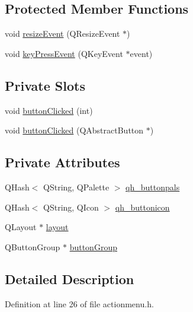 \subsection*{Protected Member Functions}
\begin{DoxyCompactItemize}
\item 
void \hyperlink{classActionMenu_a437f074013c2ac56b42050e67e6e0793}{resizeEvent} (QResizeEvent $\ast$)
\item 
void \hyperlink{classActionMenu_ac7958439c159f48ffdb9e9b8e504a33b}{keyPressEvent} (QKeyEvent $\ast$event)
\end{DoxyCompactItemize}
\subsection*{Private Slots}
\begin{DoxyCompactItemize}
\item 
void \hyperlink{classActionMenu_a4ad6df9a6b18418d8a34cb5dae95bf74}{buttonClicked} (int)
\item 
void \hyperlink{classActionMenu_ad66335742121b47be8ddd578766c23a3}{buttonClicked} (QAbstractButton $\ast$)
\end{DoxyCompactItemize}
\subsection*{Private Attributes}
\begin{DoxyCompactItemize}
\item 
QHash$<$ QString, QPalette $>$ \hyperlink{classActionMenu_ab5d9ea9892dc558b8cc9fb1eafb60801}{qh\_\-buttonpals}
\item 
QHash$<$ QString, QIcon $>$ \hyperlink{classActionMenu_ad5e51a340311d4ba65c8d3e012db3d36}{qh\_\-buttonicon}
\item 
QLayout $\ast$ \hyperlink{classActionMenu_a001562cff4f1a3f8356eaf167d725904}{layout}
\item 
QButtonGroup $\ast$ \hyperlink{classActionMenu_a019ac48a117d01f6d52feb941486d78a}{buttonGroup}
\end{DoxyCompactItemize}


\subsection{Detailed Description}


Definition at line 26 of file actionmenu.h.



